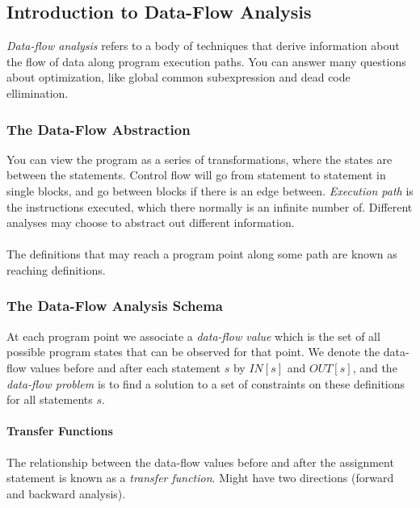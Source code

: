 \documentclass{article}
\begin{document}
\subsection{Introduction to Data-Flow Analysis} %
\label{sub:Introduction to Data-Flow Analysis}
\emph{Data-flow analysis} refers to a body of techniques that derive information about the flow of data along program execution paths. You can answer many questions about optimization, like global common subexpression and dead code ellimination.

\subsubsection{The Data-Flow Abstraction} %
\label{ssub:The Data-Flow Abstraction}
You can view the program as a series of transformations, where the states are between the statements. Control flow will go from statement to statement in single blocks, and go between blocks if there is an edge between. \emph{Execution path} is the instructions executed, which there normally is an infinite number of. Different analyses may choose to abstract out different information.\\
\\
The definitions that may reach a program point along some path are known as reaching definitions.

\subsubsection{The Data-Flow Analysis Schema} %
\label{ssub:The Data-Flow Analysis Schema}
At each program point we associate a \emph{data-flow value} which is the set of all possible program states that can be observed for that point. We denote the data-flow values before and after each statement $s$ by $IN[s]$ and $OUT[s]$, and the \emph{data-flow problem} is to find a solution to a set of constraints on these definitions for all statements $s$.

\paragraph{Transfer Functions} %
\label{par:Transfer Functions}
The relationship between the data-flow values before and after the assignment statement is known as a \emph{transfer function}. Might have two directions (forward and backward analysis).
\end{document}
